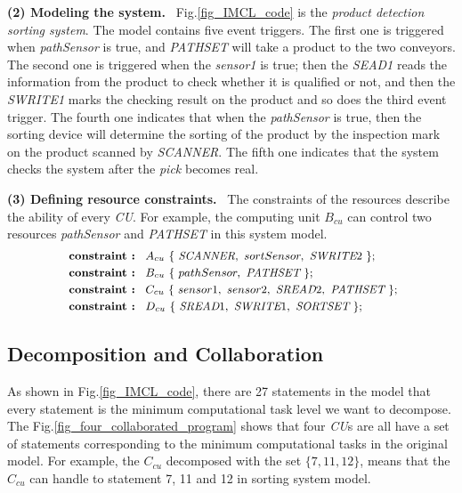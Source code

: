 \textbf{(2) Modeling the system.} \ Fig.\ref{fig_IMCL_code} is the \emph{product detection sorting system}. The model contains five event triggers. The first one is triggered when \emph{pathSensor} is true, and \emph{PATHSET} will take a product to the two conveyors. The second one is triggered when the \emph{sensor1} is true; then the \emph{SEAD1} reads the information from the product to check whether it is qualified or not, and then the \emph{SWRITE1} marks the checking result on the product and so does the third event trigger. The fourth one indicates that when the \emph{pathSensor} is true, then the sorting device will determine the sorting of the product by the inspection mark on the product scanned by \emph{SCANNER}. The fifth one indicates that the system checks the system after the \emph{pick} becomes real.

\textbf{(3) Defining resource constraints.} \ The constraints of the resources describe the ability of every \emph{CU}. For example, the computing unit $B_{cu}$ can control two resources \emph{pathSensor} and \emph{PATHSET} in this system model.
\begin{equation*}
\footnotesize
    \begin{aligned}
        \ \textbf{constraint : \ } & \textbf{$A_{cu}$} \ \{ \ \emph{SCANNER}, \ sortSensor, \ \emph{SWRITE}2 \ \};\\
        \ \textbf{constraint : \ } & \textbf{$B_{cu}$} \ \{ \ pathSensor, \ \emph{PATHSET} \ \};\\
        \ \textbf{constraint : \ } & \textbf{$C_{cu}$} \ \{ \ sensor1, \ sensor2, \ \emph{SREAD}2, \ \emph{PATHSET} \ \};\\
        \ \textbf{constraint : \ } & \textbf{$D_{cu}$} \ \{ \ \emph{SREAD}1, \ \emph{SWRITE}1, \ \emph{SORTSET} \ \};
    \end{aligned}
\end{equation*}

\subsection{Decomposition and Collaboration}

As shown in Fig.\ref{fig_IMCL_code}, there are 27 statements in the model that every statement is the minimum computational task level we want to decompose.
The Fig.\ref{fig_four_collaborated_program} shows that four \emph{CU}s are all have a set of statements corresponding to the minimum computational tasks in the original model.
For example, the $C_{cu}$ decomposed with the set $\{7,11,12\}$, means that the $C_{cu}$ can handle to statement 7, 11 and 12 in sorting system model.

